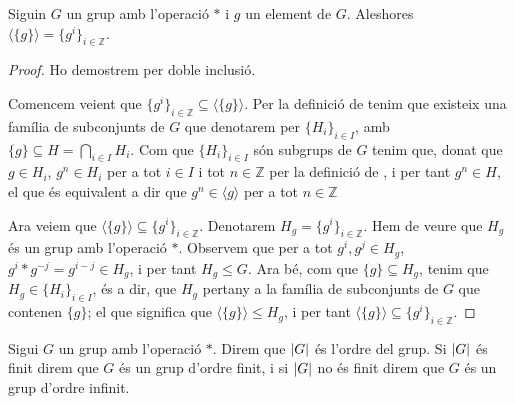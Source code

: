 \documentclass[../Apunts.tex]{subfiles}
\begin{document}
	\begin{proposition}
		\label{prop:forma grups cíclics}
		Siguin \(G\) un grup amb l'operació \(\ast\) i \(g\) un element de \(G\). Aleshores \(\langle\{g\}\rangle=\{g^{i}\}_{i\in\mathbb{Z}}\).
		\begin{proof}
			Ho demostrem per doble inclusió.
			
			Comencem veient que \(\{g^{i}\}_{i\in\mathbb{Z}}\subseteq\langle\{g\}\rangle\). Per la definició de  tenim que existeix una família de subconjunts de \(G\) que denotarem per \(\{H_{i}\}_{i\in I}\), amb \(\{g\}\subseteq H=\bigcap_{i\in I}H_{i}\). Com que \(\{H_{i}\}_{i\in I}\) són subgrups de \(G\) tenim que, donat que \(g\in H_{i}\), \(g^{n}\in H_{i}\) per a tot \(i\in I\) i tot \(n\in\mathbb{Z}\) per la definició de , i per tant \(g^{n}\in H\), el que és equivalent a dir que \(g^{n}\in \langle g\rangle\) per a tot \(n\in\mathbb{Z}\)
			
			Ara veiem que \(\langle\{g\}\rangle\subseteq\{g^{i}\}_{i\in\mathbb{Z}}\). Denotarem \(H_{g}=\{g^{i}\}_{i\in\mathbb{Z}}\). Hem de veure que \(H_{g}\) és un grup amb l'operació \(\ast\). Observem que per a tot \(g^{i},g^{j}\in H_{g}\), \(g^{i}\ast g^{-j}=g^{i-j}\in H_{g}\), i per tant \(H_{g}\leq G\). Ara bé, com que \(\{g\}\subseteq H_{g}\), tenim que \(H_{g}\in\{H_{i}\}_{i\in I}\), és a dir, que \(H_{g}\) pertany a la família de subconjunts de \(G\) que contenen \(\{g\}\); el que significa que \(\langle\{g\}\rangle\leq H_{g}\), i per tant \(\langle\{g\}\rangle\subseteq\{g^{i}\}_{i\in\mathbb{Z}}\).
		\end{proof}
	\end{proposition}
	\begin{definition}
		\label{def:ordre d'un grup}
		Sigui \(G\) un grup amb l'operació \(\ast\). Direm que \(\abs{G}\) és l'ordre del grup.
		Si \(\abs{G}\) és finit direm que \(G\) és un grup d'ordre finit, i si \(\abs{G}\) no és finit direm que \(G\) és un grup d'ordre infinit.
	\end{definition}
\end{document}
